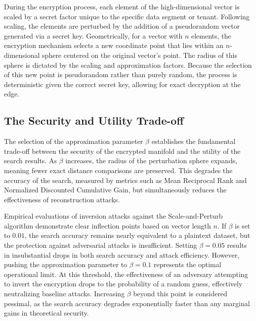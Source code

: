 \documentclass[12pt]{article}
\begin{document}
During the encryption process, each element of the high-dimensional vector is scaled by a secret factor unique to the specific data segment or tenant. Following scaling, the elements are perturbed by the addition of a pseudorandom vector generated via a secret key. Geometrically, for a vector with $n$ elements, the encryption mechanism selects a new coordinate point that lies within an $n$-dimensional sphere centered on the original vector's point. The radius of this sphere is dictated by the scaling and approximation factors. Because the selection of this new point is pseudorandom rather than purely random, the process is deterministic given the correct secret key, allowing for exact decryption at the edge.

\subsection{The Security and Utility Trade-off}

The selection of the approximation parameter $\beta$ establishes the fundamental trade-off between the security of the encrypted manifold and the utility of the search results. As $\beta$ increases, the radius of the perturbation sphere expands, meaning fewer exact distance comparisons are preserved. This degrades the accuracy of the search, measured by metrics such as Mean Reciprocal Rank and Normalized Discounted Cumulative Gain, but simultaneously reduces the effectiveness of reconstruction attacks.

Empirical evaluations of inversion attacks against the Scale-and-Perturb algorithm demonstrate clear inflection points based on vector length $n$. If $\beta$ is set to $0.01$, the search accuracy remains nearly equivalent to a plaintext dataset, but the protection against adversarial attacks is insufficient. Setting $\beta = 0.05$ results in insubstantial drops in both search accuracy and attack efficiency. However, pushing the approximation parameter to $\beta = 0.1$ represents the optimal operational limit. At this threshold, the effectiveness of an adversary attempting to invert the encryption drops to the probability of a random guess, effectively neutralizing baseline attacks. Increasing $\beta$ beyond this point is considered pessimal, as the search accuracy degrades exponentially faster than any marginal gains in theoretical security.
\end{document}
